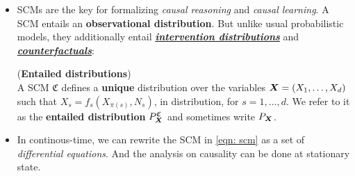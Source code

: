 \documentclass[11pt]{article}
\begin{document}
\begin{itemize}
\item SCMs are the key for formalizing \emph{causal reasoning} and \emph{causal learning}. A SCM entails an \textbf{observational distribution}. But unlike usual probabilistic models, they additionally entail \underline{\textbf{\emph{intervention distributions}}} and \underline{\textbf{\emph{counterfactuals}}}:
\begin{proposition}(\textbf{Entailed distributions}) \citep{peters2017elements}\\
A SCM $\mathfrak{C}$ defines a \textbf{unique} distribution over the variables $\boldsymbol{X} = (X_1, \ldots, X_d)$ such that $X_s = f_{s}(X_{\pi(s)}, N_s)$, in distribution, for
$s=1,\ldots, d$. We refer to it as the \textbf{entailed distribution} $P_{\boldsymbol{X}}^{\mathfrak{C}}$ and sometimes write $P_{\boldsymbol{X}}$.
\end{proposition}

\item In continous-time, we can rewrite the SCM in \eqref{eqn: scm} as a set of \emph{differential equations}. And the analysis on causality can be done at stationary state.
\end{itemize}
\end{document}
